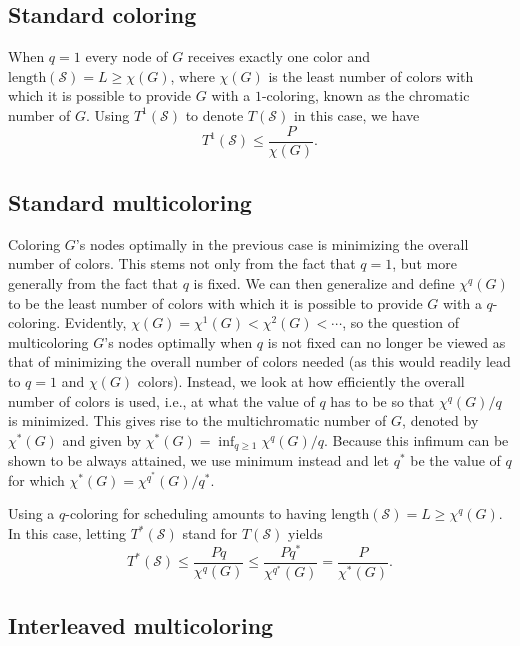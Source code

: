 \documentclass{article}
\begin{document}
\subsection{Standard coloring}

When $q=1$ every node of $G$ receives exactly one color and
$\mathrm{length}(\mathcal{S})=L\ge\chi(G)$, where $\chi(G)$ is the least number
of colors with which it is possible to provide $G$ with a $1$-coloring, known as
the chromatic number of $G$. Using $T^1(\mathcal{S})$ to denote $T(\mathcal{S})$
in this case, we have
\begin{equation}
T^1(\mathcal{S})\le
\frac{P}{\chi(G)}.
\label{eq:T1}
\end{equation}

\subsection{Standard multicoloring}

Coloring $G$'s nodes optimally in the previous case is minimizing the overall
number of colors. This stems not only from the fact that $q=1$, but more
generally from the fact that $q$ is fixed. We can then generalize and define
$\chi^q(G)$ to be the least number of colors with which it is possible to
provide $G$ with a $q$-coloring. Evidently,
$\chi(G)=\chi^1(G)<\chi^2(G)<\cdots$, so the question of multicoloring $G$'s
nodes optimally when $q$ is not fixed can no longer be viewed as that of
minimizing the overall number of colors needed (as this would readily lead to
$q=1$ and $\chi(G)$ colors). Instead, we look at how efficiently the overall
number of colors is used, i.e., at what the value of $q$ has to be so that
$\chi^q(G)/q$ is minimized. This gives rise to the multichromatic number of $G$,
denoted by $\chi^*(G)$ and given by $\chi^*(G)=\inf_{q\ge 1}\chi^q(G)/q$.
Because this infimum can be shown to be always attained, we use minimum instead
and let $q^*$ be the value of $q$ for which $\chi^*(G)=\chi^{q^*}(G)/q^*$.

Using a $q$-coloring for scheduling amounts to having
$\mathrm{length}(\mathcal{S})=L\ge\chi^q(G)$. In this case, letting
$T^*(\mathcal{S})$ stand for $T(\mathcal{S})$ yields
\begin{equation}
T^*(\mathcal{S})\le
\frac{Pq}{\chi^q(G)}\le
\frac{Pq^*}{\chi^{q^*}(G)}=
\frac{P}{\chi^*(G)}.
\label{eq:T*}
\end{equation}

\subsection{Interleaved multicoloring}
\end{document}
